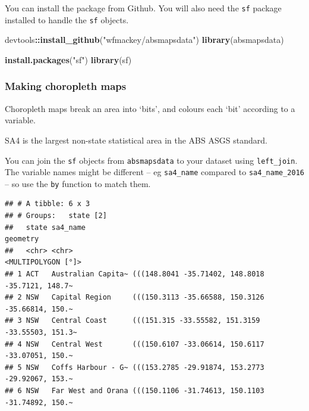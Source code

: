 \documentclass[]{book}
\newenvironment{Shaded}{\begin{snugshade}}{\end{snugshade}}
\newcommand{\DataTypeTok}[1]{\textcolor[rgb]{0.13,0.29,0.53}{#1}}
\newcommand{\KeywordTok}[1]{\textcolor[rgb]{0.13,0.29,0.53}{\textbf{#1}}}
\newcommand{\NormalTok}[1]{#1}
\newcommand{\OperatorTok}[1]{\textcolor[rgb]{0.81,0.36,0.00}{\textbf{#1}}}
\newcommand{\StringTok}[1]{\textcolor[rgb]{0.31,0.60,0.02}{#1}}
\begin{document}
You can install the package from Github. You will also need the \texttt{sf} package installed to handle the \texttt{sf} objects.

\begin{Shaded}
\begin{Highlighting}[]
\NormalTok{devtools}\OperatorTok{::}\KeywordTok{install_github}\NormalTok{(}\StringTok{"wfmackey/absmapsdata"}\NormalTok{)}
\KeywordTok{library}\NormalTok{(absmapsdata)}

\KeywordTok{install.packages}\NormalTok{(}\StringTok{"sf"}\NormalTok{)}
\KeywordTok{library}\NormalTok{(sf)}
\end{Highlighting}
\end{Shaded}

\hypertarget{making-choropleth-maps}{%
\subsubsection{Making choropleth maps}\label{making-choropleth-maps}}

Choropleth maps break an area into `bits', and colours each `bit' according to a variable.

SA4 is the largest non-state statistical area in the ABS ASGS standard.

You can join the \texttt{sf} objects from \texttt{absmapsdata} to your dataset using \texttt{left\_join}. The variable names might be different -- eg \texttt{sa4\_name} compared to \texttt{sa4\_name\_2016} -- so use the \texttt{by} function to match them.

\begin{Shaded}
\end{Shaded}

\begin{verbatim}
## # A tibble: 6 x 3
## # Groups:   state [2]
##   state sa4_name                                                   geometry
##   <chr> <chr>                                            <MULTIPOLYGON [°]>
## 1 ACT   Australian Capita~ (((148.8041 -35.71402, 148.8018 -35.7121, 148.7~
## 2 NSW   Capital Region     (((150.3113 -35.66588, 150.3126 -35.66814, 150.~
## 3 NSW   Central Coast      (((151.315 -33.55582, 151.3159 -33.55503, 151.3~
## 4 NSW   Central West       (((150.6107 -33.06614, 150.6117 -33.07051, 150.~
## 5 NSW   Coffs Harbour - G~ (((153.2785 -29.91874, 153.2773 -29.92067, 153.~
## 6 NSW   Far West and Orana (((150.1106 -31.74613, 150.1103 -31.74892, 150.~
\end{verbatim}
\end{document}
